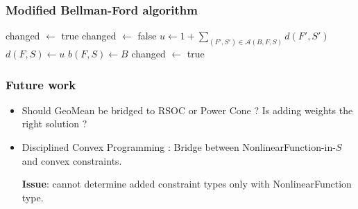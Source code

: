 \documentclass{beamer}
\begin{document}
\begin{frame}
  \frametitle{Modified Bellman-Ford algorithm}
  \begin{algorithmic}
    \STATE changed $\leftarrow$ true
      \STATE changed $\leftarrow$ false
          \STATE $u \leftarrow 1 + \sum_{(F', S') \in \mathcal{A}(B, F, S)} d(F', S')$
            \STATE $d(F, S) \leftarrow u$
            \STATE $b(F, S) \leftarrow B$
            \STATE changed $\leftarrow$ true
          \ENDIF
        \ENDFOR
      \ENDFOR
    \ENDWHILE
  \end{algorithmic}
\end{frame}

\begin{frame}
  \frametitle{Future work}
  \begin{itemize}
    \item Should GeoMean be bridged to RSOC or Power Cone ?
      Is adding \alert{weights} the right solution ?
    \item Disciplined Convex Programming : Bridge between NonlinearFunction-in-$S$
      and convex constraints.

      \textbf{Issue}: cannot determine added constraint types only with NonlinearFunction \alert{type}.
  \end{itemize}
\end{frame}
\end{document}
